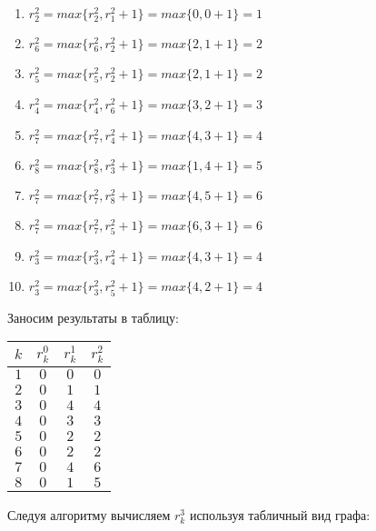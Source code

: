 \begin{enumerate}[nosep]
	\item $r_2^2 = max\{r_2^2, r_1^2 + 1\} = max\{0,0+1\} = 1$
	\item $r_6^2 = max\{r_6^2, r_2^2 + 1\} = max\{2,1+1\} = 2$
	\item $r_5^2 = max\{r_5^2, r_2^2 + 1\} = max\{2,1+1\} = 2$
	\item $r_4^2 = max\{r_4^2, r_6^2 + 1\} = max\{3,2+1\} = 3$
	\item $r_7^2 = max\{r_7^2, r_4^2 + 1\} = max\{4,3+1\} = 4$
	\item $r_8^2 = max\{r_8^2, r_3^2 + 1\} = max\{1,4+1\} = 5$
	\item $r_7^2 = max\{r_7^2, r_8^2 + 1\} = max\{4,5+1\} = 6$
	\item $r_7^2 = max\{r_7^2, r_5^2 + 1\} = max\{6,3+1\} = 6$
	\item $r_3^2 = max\{r_3^2, r_4^2 + 1\} = max\{4,3+1\} = 4$
	\item $r_3^2 = max\{r_3^2, r_5^2 + 1\} = max\{4,2+1\} = 4$
\end{enumerate}

Заносим результаты в таблицу:

\begin{table}[H]
	\centering
	\begin{tabular}{ | c | c | c | c |} 
		\hline
		$k$ & $r_k^0$ & $r_k^1$ & $r_k^2$ \\ \hline
		$1$ & $0$ & $0$ & $0$ \\ \hline
		$2$ & $0$ & $1$ & $1$ \\ \hline
		$3$ & $0$ & $4$ & $4$ \\ \hline
		$4$ & $0$ & $3$ & $3$ \\ \hline
		$5$ & $0$ & $2$ & $2$ \\ \hline
		$6$ & $0$ & $2$ & $2$ \\ \hline
		$7$ & $0$ & $4$ & $6$ \\ \hline
		$8$ & $0$ & $1$ & $5$ \\ \hline
	\end{tabular}
\end{table}


\bigskip

Следуя алгоритму вычисляем $r^3_k$ используя табличный вид графа:

